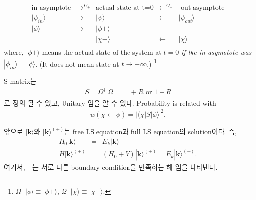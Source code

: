 \documentclass[10pt]{book}
\def\bm{\boldsymbol}
\newcommand{\bea}{\begin{eqnarray}}
\newcommand{\eea}{\end{eqnarray}}
\newcommand{\no}{\nonumber \\}
\def\vk{{\bm k}}
\def\la{\langle}
\def\ra{\rangle}
\begin{document}
  
\begin{equation}
\boxed{
\begin{array}{ccccc}
\mbox{in asymptote} & \rightarrow^{\Omega_+} & \mbox{actual state at t=0}
                    & \leftarrow^{\Omega_-}  & \mbox{ out asymptote}\\
|\psi_{in}\ra       & \rightarrow            & |\psi\ra 
                    &\leftarrow              & |\psi_{out}\ra\\
|\phi\ra            &\rightarrow             &|\phi+\ra
                    &                        &  \\
                    &                        & |\chi-\ra
                    & \leftarrow             & |\chi\ra\\       
\end{array}
}
\end{equation}
where, $|\phi+\ra$ means the actual state of the system at $t=0$
{\it if the in asymptote was $|\phi_{in}\ra=|\phi\ra$}.
(It does not mean state at $t\to +\infty$.)
\footnote{$\Omega_{+}|\phi\ra\equiv |\phi+\ra$,
$\Omega_{-}|\chi\ra\equiv |\chi-\ra$.}


S-matrix는  
\bea
S=\Omega^\dagger_{-}\Omega_{+}=1+R \mbox{ or } 1-R
\eea
로 정의 될 수 있고, Unitary 임을 알 수 있다. 
Probability is related with
\bea
w(\chi\leftarrow \phi)=|\la\chi|S|\phi\ra|^2.
\eea

앞으로 
$|\vk\ra$와 $|\vk\ra^{(\pm)}$는 free LS equation과 
full LS equation의 solution이다. 즉,
\bea
H_0|\vk\ra&=&E_k|\vk\ra\no
H|\vk\ra^{(\pm)}&=&(H_0+V)|\vk\ra^{(\pm)}=E_k|\vk\ra^{(\pm)}.
\eea
여기서, $\pm$는 서로 다른 boundary condition을 만족하는 해 임을 
나타낸다.
\end{document}

